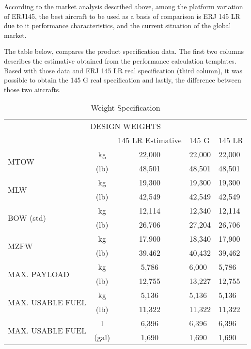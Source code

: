 According to the market analysis described above, among the platform variation of ERJ145, the best aircraft to be used as a basis of comparison is ERJ 145 LR due to it performance characteristics,  and the current situation of the global market.

The table below, compares the product specification data. The first two columns describes the estimative obtained from the performance calculation templates. Based with those data and ERJ 145 LR real specification (third column), it was possible to obtain the 145 G real specification and lastly, the difference between those two aircrafts.


\begin{table}[H]
  \centering
  \caption{Weight Specification}
    \begin{tabular}{rcc p{2cm} p{2cm}}
    \toprule
    \multicolumn{5}{c}{\multirow{2}[1]{*}{DESIGN WEIGHTS}} \\
    \multicolumn{5}{c}{} \\
    \midrule
    \multicolumn{2}{c}{} & 145 LR Estimative & 145 G & 145 LR \\
    \midrule
    \multicolumn{1}{l}{\multirow{2}[2]{*}{MTOW}} & kg    & 22,000 & 22,000 & 22,000 \\
    \multicolumn{1}{l}{} & (lb)  & 48,501 & 48,501 & 48,501 \\
    \midrule
    \multicolumn{1}{l}{\multirow{2}[2]{*}{MLW}} & kg    & 19,300 & 19,300 & 19,300 \\
    \multicolumn{1}{l}{} & (lb)  & 42,549 & 42,549 & 42,549 \\
    \midrule
    \multicolumn{1}{l}{\multirow{2}[2]{*}{BOW (std)}} & kg    & 12,114 & 12,340 & 12,114 \\
    \multicolumn{1}{l}{} & (lb)  & 26,706 & 27,204 & 26,706 \\
    \midrule
    \multicolumn{1}{l}{\multirow{2}[2]{*}{MZFW}} & kg    & 17,900 & 18,340 & 17,900 \\
    \multicolumn{1}{l}{} & (lb)  & 39,462 & 40,432 & 39,462 \\
    \midrule
    \multicolumn{1}{l}{\multirow{2}[2]{*}{MAX. PAYLOAD}} & kg    & 5,786 & 6,000 & 5,786 \\
    \multicolumn{1}{l}{} & (lb)  & 12,755 & 13,227 & 12,755 \\
    \midrule
    \multicolumn{1}{l}{\multirow{2}[2]{*}{MAX. USABLE FUEL}} & kg    & 5,136 & 5,136 & 5,136 \\
    \multicolumn{1}{l}{} & (lb)  & 11,322 & 11,322 & 11,322 \\
    \midrule
    \multicolumn{1}{l}{\multirow{2}[2]{*}{MAX. USABLE FUEL}} & l     & 6,396 & 6,396 & 6,396 \\
    \multicolumn{1}{l}{} & (gal) & 1,690 & 1,690 & 1,690 \\
    \bottomrule
    \end{tabular}%
  \label{tab:addlabel}%
\end{table}%



